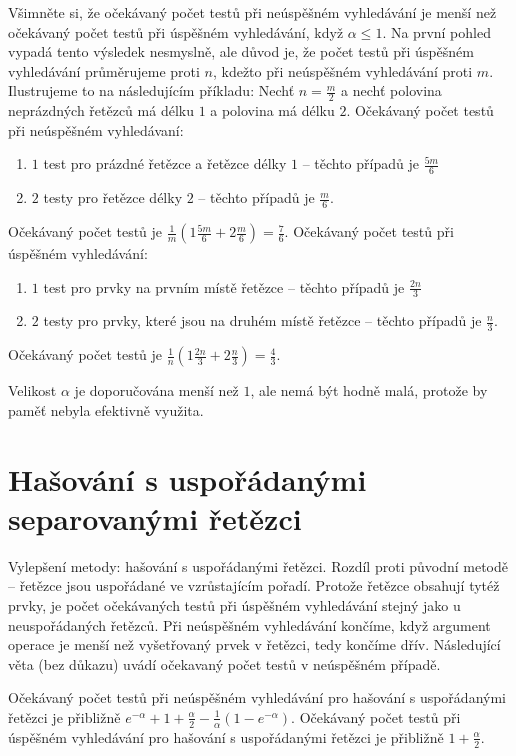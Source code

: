 \documentclass[a4paper,12pt]{article}
\begin{document}
Všimněte si, že očekávaný počet testů 
při neúspěšném vy\-hledávání je menší než očekávaný 
počet testů při úspěšném vy\-hledávání, když 
$\alpha\le 1$. Na první pohled vypadá tento výsledek nesmyslně, 
ale důvod je, že počet testů při 
úspěšném vy\-hledávání průměrujeme proti $
n$, 
kdežto při neúspěšném vy\-hledávání proti $
m$. Ilustrujeme 
to na následujícím příkladu:\newline 
Nechť $n=\frac m2$ a nechť polovina neprázdných 
řetězců má délku $1$ a polovina má délku $
2$. \newline 
Očekávaný počet testů při neúspěšném 
vyhledávaní:
\begin{enumerate}
\item 
$1$ test pro prázdné řetězce a řetězce 
délky $1$ -- těchto případů je $\frac {5m}6$
\item 
$2$ testy pro řetězce délky $2$ -- těchto případů je 
$\frac m6$.
\end{enumerate}
Očekávaný počet testů je 
$\frac 1m(1\frac {5m}6+2\frac m6)=\frac 76$.\newline 
Očekávaný počet testů při úspěšném 
vyhledávání: 
\begin{enumerate}
\item 
$1$ test pro prvky na prvním místě řetězce -- těchto 
případů je $\frac {2n}3$
\item 
$2$ testy pro prvky, které jsou na druhém místě řetězce -- těchto 
případů je $\frac n3$.
\end{enumerate}
Očekávaný počet testů je $\frac 1n(1\frac {2n}
3+2\frac n3)=\frac 43$.

Velikost $\alpha$ je doporučována menší než $
1$, ale nemá být 
hodně malá, protože by paměť nebyla efektivně využita. 

\section{Hašování s uspořádanými separovanými řetězci}

Vylepšení metody: hašování s uspořádanými řetězci.
Rozdíl proti původní metodě -- řetězce jsou 
uspořádané ve vzrůsta\-jícím pořadí. Protože 
řetězce obsahují tytéž prvky, je počet očeká\-va\-ných testů 
při úspěšném vyhledávání stejný jako u ne\-uspořádaných 
řetězců. Při neúspěšném vyhledávání končíme, 
když argument operace je menší než vyšetřovaný prvek 
v řetěz\-ci, tedy končíme dřív. Následující věta (bez 
důkazu) uvádí očekavaný počet testů v 
neúspěšném případě.

\begin{veta}Očekávaný počet testů při 
neúspěšném vyhledávání pro hašování s uspořá\-danými 
řetězci je přibližně $e^{-\alpha}+1+\frac {\alpha}
2-\frac 1{\alpha}(1-e^{-\alpha})$. Očekávaný 
počet testů při úspěšném vyhledávání pro 
hašování s uspořádanými řetězci je 
přibližně $1+\frac {\alpha}2.$
\end{veta}
\end{document}
